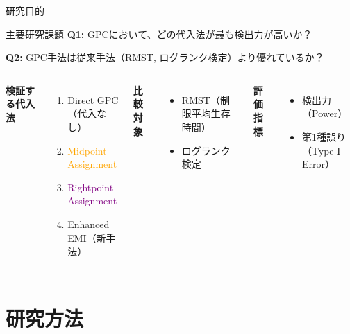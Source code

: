 \documentclass[11pt,aspectratio=169]{beamer}
\begin{document}
\begin{frame}{研究目的}
\begin{alertblock}{主要研究課題}
\textbf{Q1:} GPCにおいて、どの代入法が最も検出力が高いか？

\textbf{Q2:} GPC手法は従来手法（RMST, ログランク検定）より優れているか？
\end{alertblock}

\vspace{1em}

\begin{columns}
\textbf{検証する代入法}
\begin{enumerate}
\item \textcolor{primary}{Direct GPC}（代入なし）
\item \textcolor{orange}{Midpoint Assignment}
\item \textcolor{purple}{Rightpoint Assignment}
\item \textcolor{accent}{Enhanced EMI}（新手法）
\end{enumerate}

\textbf{比較対象}
\begin{itemize}
\item RMST（制限平均生存時間）
\item ログランク検定
\end{itemize}

\vspace{0.5em}
\textbf{評価指標}
\begin{itemize}
\item 検出力（Power）
\item 第1種誤り（Type I Error）
\end{itemize}
\end{columns}
\end{frame}

\section{研究方法}
\end{document}
